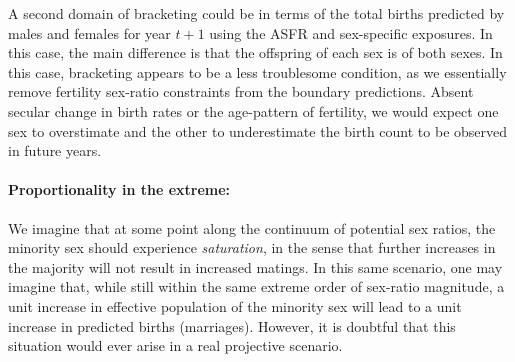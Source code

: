 A second domain of bracketing could be in terms of the total births predicted by
males and females for year $t+1$ using the ASFR and sex-specific exposures. In
this case, the main difference is that the offspring of each sex is of both
sexes. In this case, bracketing appears to be a less troublesome condition, as
we essentially remove fertility sex-ratio constraints from the boundary
predictions. Absent secular change in birth rates or the age-pattern of fertility, 
we would expect one sex to overstimate and the other to underestimate the birth
count to be observed in future years. 

\paragraph{Proportionality in the extreme:} We imagine that at some point along
the continuum of potential sex ratios, the minority sex should experience
\textit{saturation}, in the sense that further increases in the majority will
not result in increased matings. In this same scenario, one may imagine that,
while still within the same extreme order of sex-ratio magnitude, a unit
increase in effective population of the minority sex will lead to a unit
increase in predicted births (marriages). However, it is doubtful that this
situation would ever arise in a real projective scenario. 
